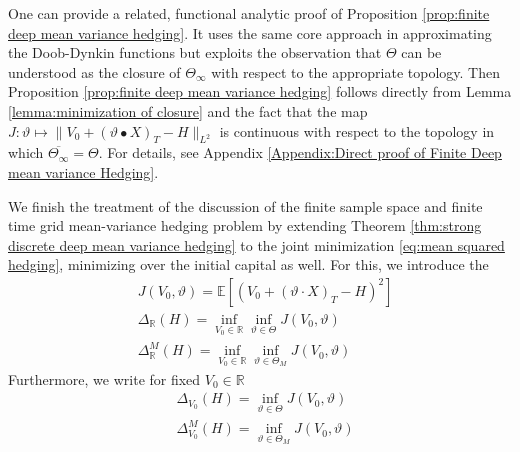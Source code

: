 \documentclass[11pt,a4paper,twoside,openany]{report}
\numberwithin{equation}{section}
\theoremstyle{plain} %
\theoremstyle{definition} %
\theoremstyle{remark} %
\begin{document}
One can provide a related, functional analytic proof of Proposition \ref{prop:finite deep mean variance hedging}. It uses the same core approach in approximating the Doob-Dynkin functions but exploits the observation that \(\Theta\) can be understood as the closure of \(\Theta_{\infty}\) with respect to the appropriate topology. Then Proposition \ref{prop:finite deep mean variance hedging} follows directly from Lemma \ref{lemma:minimization of closure} and the fact that the map \(J:\vartheta\mapsto\lVert V_0+(\vartheta\bullet X)_T-H\rVert_{L^2}\) is continuous with respect to the topology in which \(\overline{\Theta_{\infty}}=\Theta\). For details, see Appendix \ref{Appendix:Direct proof of Finite Deep mean variance Hedging}.



We finish the treatment of the discussion of the finite sample space and finite time grid mean-variance hedging problem by extending Theorem \ref{thm:strong discrete deep mean variance hedging} to the joint minimization \eqref{eq:mean squared hedging}, minimizing over the initial capital as well. For this, we introduce the \begin{align*}  
&J(V_0,\vartheta)= \mathbb{E}[(V_0+(\vartheta\cdot X)_T-H)^2]\\
&\Delta_{\mathbb{R}}(H)=\inf_{V_0\in\mathbb{R}}\inf_{\vartheta\in \Theta}J(V_0,\vartheta)
\\
&\Delta^M_{\mathbb{R}}(H)=\inf_{V_0\in\mathbb{R}}\inf_{\vartheta\in \Theta_M}J(V_0,\vartheta)
\end{align*}
Furthermore, we write for fixed \(V_0\in\mathbb{R}\)
\begin{align*}
    &\Delta_{V_0}(H)=\inf_{\vartheta\in\Theta}J(V_0,\vartheta)\\
    &\Delta^M_{V_0}(H)=\inf_{\vartheta\in\Theta_M}J(V_0,\vartheta)
\end{align*}
\end{document}
